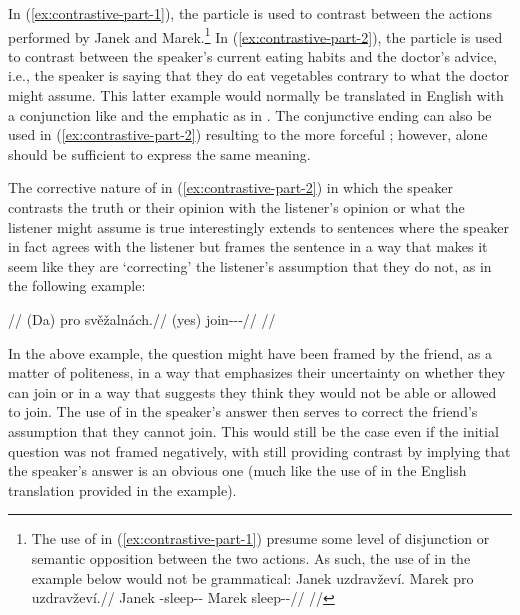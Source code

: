 In (\ref{ex:contrastive-part-1}), the particle  is used to contrast
between the actions performed by Janek and Marek.\footnote{The use of 
in (\ref{ex:contrastive-part-1}) presume some level of disjunction or semantic
opposition between the two actions. As such, the use of  in the example
below would not be grammatical:
\ex[lingstyle=fnex,belowexskip=-1em,aboveglftskip=1pt]
\begingl
	\gla \ljudge{*}Janek uzdravževí. Marek pro uzdravževí.//
	\glb Janek \Refl{}-sleep-\Av{}-\Cont{} Marek \Cntr{} sleep-\Av{}-\Cont{}//
	\glft {}//
\endgl
\xe
} In (\ref{ex:contrastive-part-2}), the particle  is used to contrast
between the speaker's current eating habits and the doctor's advice, i.e., the
speaker is saying that they do eat vegetables contrary to what the doctor might
assume. This latter example would normally be translated in English with a
conjunction like  and the emphatic  as in . The conjunctive ending  can also be used in
(\ref{ex:contrastive-part-2}) resulting to the more forceful ; however,  alone should be
sufficient to express the same meaning.

The corrective nature of  in (\ref{ex:contrastive-part-2}) in which the
speaker contrasts the truth or their opinion with the listener's opinion or what
the listener might assume is true interestingly extends to sentences where the
speaker in fact agrees with the listener but frames the sentence in a way that
makes it seem like they are `correcting' the listener's assumption that they do
not, as in the following example:

\pex
\begingl
	\glpreamble {}//
	\gla (Da) pro svěžalnách.//
	\glb (yes) \Cntr{} join-\Av{}-\Pot{}-\Ctp{}//
	\glft {}//
\endgl
\xe

In the above example, the question might have been framed by the friend, as a
matter of politeness, in a way that emphasizes their uncertainty on whether they
can join or in a way that suggests they think they would not be able or allowed
to join. The use of  in the speaker's answer then serves to correct the
friend's assumption that they cannot join. This would still be the case even if
the initial question was not framed negatively, with  still providing
contrast by implying that the speaker's answer is an obvious one (much like the
use of  in the English translation provided in the example).

